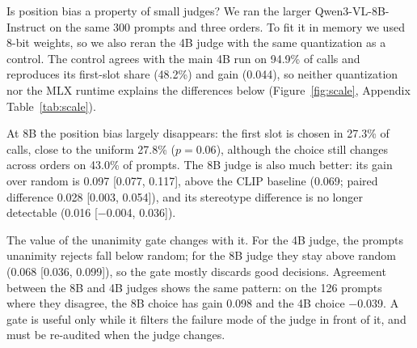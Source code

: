 Is position bias a property of small judges? We ran the larger Qwen3-VL-8B-Instruct on the same 300 prompts and three orders. To fit it in memory we used 8-bit weights, so we also reran the 4B judge with the same quantization as a control. The control agrees with the main 4B run on 94.9\% of calls and reproduces its first-slot share (48.2\%) and gain (0.044), so neither quantization nor the MLX runtime explains the differences below (Figure~\ref{fig:scale}, Appendix Table~\ref{tab:scale}).

At 8B the position bias largely disappears: the first slot is chosen in 27.3\% of calls, close to the uniform 27.8\% ($p=0.06$), although the choice still changes across orders on 43.0\% of prompts. The 8B judge is also much better: its gain over random is 0.097 [0.077, 0.117], above the CLIP baseline (0.069; paired difference 0.028 [0.003, 0.054]), and its stereotype difference is no longer detectable (0.016 [$-$0.004, 0.036]).

The value of the unanimity gate changes with it. For the 4B judge, the prompts unanimity rejects fall below random; for the 8B judge they stay above random (0.068 [0.036, 0.099]), so the gate mostly discards good decisions. Agreement between the 8B and 4B judges shows the same pattern: on the 126 prompts where they disagree, the 8B choice has gain 0.098 and the 4B choice $-$0.039. A gate is useful only while it filters the failure mode of the judge in front of it, and must be re-audited when the judge changes.
